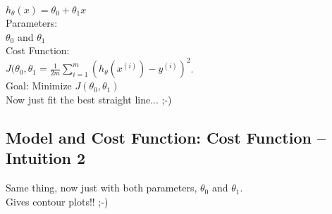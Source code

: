 \documentclass[11pt,a4paper]{article}
\begin{document}
$h_{\theta}(x) = \theta_{0} + \theta_{1} x$\\

\noindent
Parameters:\\

$\theta_{0}$ and $\theta_{1}$\\

\noindent
Cost Function:\\

$J(\theta_{0}, \theta_{1} = \frac{1}{2m} \sum_{i=1}^{m} (h_{\theta} (x^{(i)}) - y^{(i)})^{2}$.\\

\noindent
Goal: Minimize $J(\theta_{0}, \theta_{1})$\\

Now just fit the best straight line... ;-) \\



\subsection{Model and Cost Function: Cost Function -- Intuition 2}
Same thing, now just with both parameters, $\theta_{0}$ and $\theta_{1}$.\\
Gives contour plots!! ;-) \\
















































\citet{Ross15}



\end{document}
